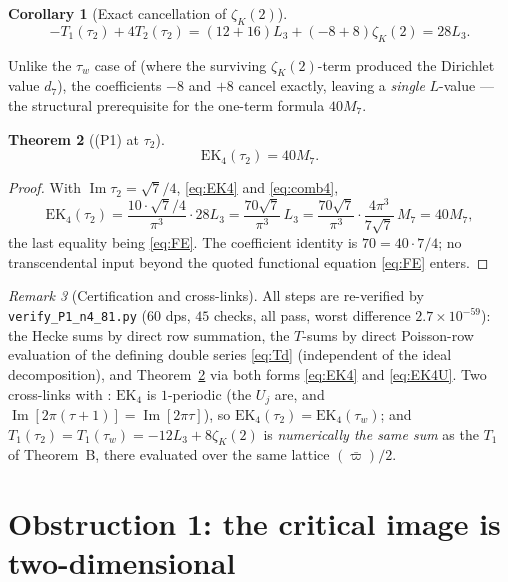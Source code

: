 \documentclass[11pt]{article}
\newtheorem{theorem}{Theorem}[section]
\newtheorem{corollary}[theorem]{Corollary}
\theoremstyle{definition}
\theoremstyle{remark}
\newtheorem{remark}[theorem]{Remark}
\newcommand{\ImT}{\operatorname{Im}}
\begin{document}
\begin{corollary}[Exact cancellation of $\zeta_K(2)$]\label{cor:comb4}
\begin{equation}\label{eq:comb4}
  -T_1(\tau_2)+4T_2(\tau_2)
  =(12+16)L_3+(-8+8)\zeta_K(2)=28L_3 .
\end{equation}
\end{corollary}

Unlike the $\tau_w$ case of \cite{Zf} (where the surviving
$\zeta_K(2)$-term produced the Dirichlet value $d_7$), the coefficients
$-8$ and $+8$ cancel exactly, leaving a \emph{single} $L$-value --- the
structural prerequisite for the one-term formula $40M_7$.

\begin{theorem}[(P1) at $\tau_2$]\label{thm:P1n4}
\[
  \mathrm{EK}_4(\tau_2)=40M_7 .
\]
\end{theorem}
\begin{proof}
With $\ImT\tau_2=\sqrt7/4$, \eqref{eq:EK4} and \eqref{eq:comb4},
\[
  \mathrm{EK}_4(\tau_2)
  =\frac{10\cdot\sqrt7/4}{\pi^3}\cdot28L_3
  =\frac{70\sqrt7}{\pi^3}\,L_3
  =\frac{70\sqrt7}{\pi^3}\cdot\frac{4\pi^3}{7\sqrt7}\,M_7
  =40M_7,
\]
the last equality being \eqref{eq:FE}. The coefficient identity is
$70=40\cdot7/4$; no transcendental input beyond the quoted functional
equation \eqref{eq:FE} enters.
\end{proof}

\begin{remark}[Certification and cross-links]
All steps are re-verified by \texttt{verify\_P1\_n4\_81.py} ($60$ dps,
$45$ checks, all pass, worst difference $2.7\times10^{-59}$): the Hecke
sums by direct row summation, the $T$-sums by direct Poisson-row
evaluation of the defining double series \eqref{eq:Td} (independent of
the ideal decomposition), and Theorem~\ref{thm:P1n4} via both forms
\eqref{eq:EK4} and \eqref{eq:EK4U}. Two cross-links with \cite{Zf}:
$\mathrm{EK}_4$ is $1$-periodic (the $U_j$ are, and
$\ImT[2\pi(\tau+1)]=\ImT[2\pi\tau]$), so
$\mathrm{EK}_4(\tau_2)=\mathrm{EK}_4(\tau_w)$; and
$T_1(\tau_2)=T_1(\tau_w)=-12L_3+8\zeta_K(2)$ is \emph{numerically the
same sum} as the $T_1$ of Theorem~B, there evaluated over the same
lattice $(\bar\varpi)/2$.
\end{remark}

\section{Obstruction 1: the critical image is two-dimensional}\label{sec:astroid}
\end{document}
